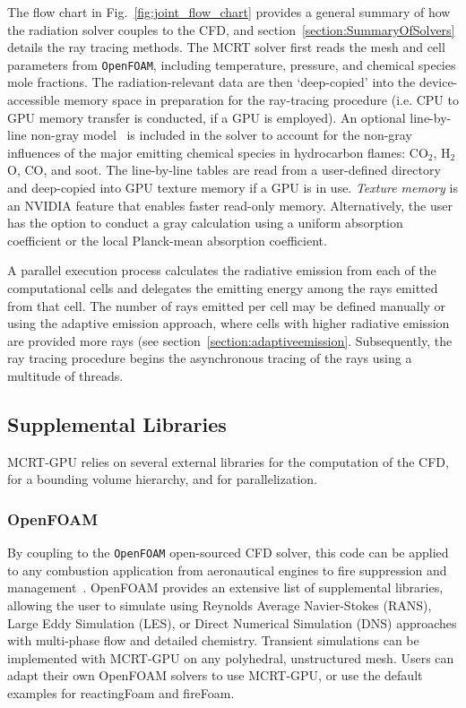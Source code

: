 The flow chart in Fig.~\ref{fig:joint_flow_chart} provides a general summary of how the radiation solver couples to the CFD, and section~\ref{section:SummaryOfSolvers} details the ray tracing methods. The MCRT solver first reads the mesh and cell parameters from \texttt{OpenFOAM}, including temperature, pressure, and chemical species mole fractions. The radiation-relevant data are then `deep-copied' into the device-accessible memory space in preparation for the ray-tracing procedure (i.e. CPU to GPU memory transfer is conducted, if a GPU is employed). An optional line-by-line non-gray model~\cite{Ren2019Line-by-lineSystem} is included in the solver to account for the non-gray influences of the major emitting chemical species in hydrocarbon flames: CO$_2$, H$_2$O, CO, and soot.
The line-by-line tables are read from a user-defined directory and deep-copied into GPU texture memory if a GPU is in use. 
\textit{Texture memory} is an NVIDIA feature that enables faster read-only memory. Alternatively, the user has the option to conduct a gray calculation using a uniform absorption coefficient or the local Planck-mean absorption coefficient. 

A parallel execution process calculates the radiative emission from each of the computational cells and delegates the emitting energy among the rays emitted from that cell. The number of rays emitted per cell may be defined manually or using the adaptive emission approach, where cells with higher radiative emission are provided more rays (see section~\ref{section:adaptiveemission}. Subsequently, the ray tracing procedure begins the asynchronous tracing of the rays using a multitude of threads.

\subsection{Supplemental Libraries}\label{section:SupplementalLibraries}
MCRT-GPU relies on several external libraries for the computation of the CFD, for a bounding volume hierarchy, and for parallelization.

\subsubsection{OpenFOAM}
By coupling to the \verb|OpenFOAM| open-sourced CFD solver, this code can be applied to any combustion application from aeronautical engines to fire suppression and management~\cite{Weller1998ATechniques}. OpenFOAM provides an extensive list of supplemental libraries, allowing the user to simulate using Reynolds Average Navier-Stokes (RANS), Large Eddy Simulation (LES), or Direct Numerical Simulation (DNS) approaches with multi-phase flow and detailed chemistry. 
Transient simulations can be implemented with MCRT-GPU on any polyhedral, unstructured mesh.
Users can adapt their own OpenFOAM solvers to use MCRT-GPU, or use the default examples for reactingFoam and fireFoam.

